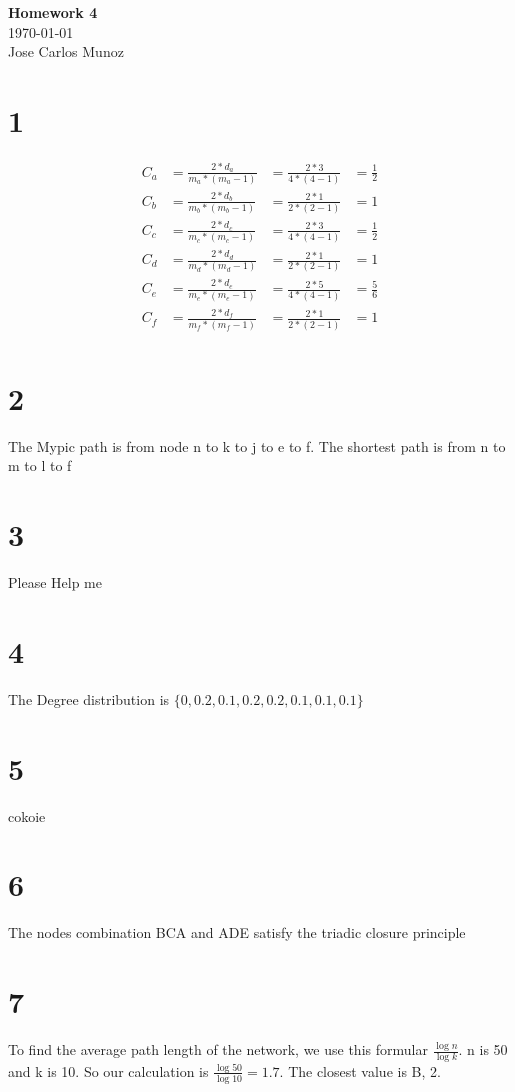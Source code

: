 \documentclass[12pt,english]{article}
\begin{document}
\begin{center}
    \Large
    \textbf{Homework 4}\\
    \small
    \today\\
    \large
    Jose Carlos Munoz
\end{center}
\section*{1}
\begin{align*}
C_a &= \frac{2 * d_a}{m_a * (m_a -1)} &= \frac{2 *3}{4 * (4-1)} &= \frac{1}{2}\\
C_b &= \frac{2 * d_b}{m_b * (m_b -1)} &= \frac{2 *1}{2 * (2-1)} &= 1\\
C_c &= \frac{2 * d_c}{m_c * (m_c -1)} &= \frac{2 *3}{4 * (4-1)} &=  \frac{1}{2}\\
C_d &= \frac{2 * d_d}{m_d * (m_d -1)} &= \frac{2 *1}{2 * (2-1)} &= 1\\
C_e &= \frac{2 * d_e}{m_e * (m_e -1)} &= \frac{2 *5}{4 * (4-1)} &=  \frac{5}{6}\\
C_f &= \frac{2 * d_f}{m_f * (m_f -1)} &= \frac{2 *1}{2 * (2-1)} &= 1\\
\end{align*}
\section*{2}
The Mypic path is from node n to k to j to e to f. The shortest path is from n to m to l to f
\section*{3}
Please Help me
\section*{4}
The Degree distribution is $\{0, 0.2, 0.1, 0.2 , 0.2, 0.1, 0.1, 0.1\}$
\section*{5}
cokoie
\section*{6}
The nodes combination BCA and ADE satisfy the triadic closure principle
\section*{7}
To find the average path length of the network, we use this formular $\frac{\log n}{\log k}$. n is 50 and k is 10. So our calculation is $\frac{\log 50}{\log 10} = 1.7$. The closest value is B, 2.
\end{document}
